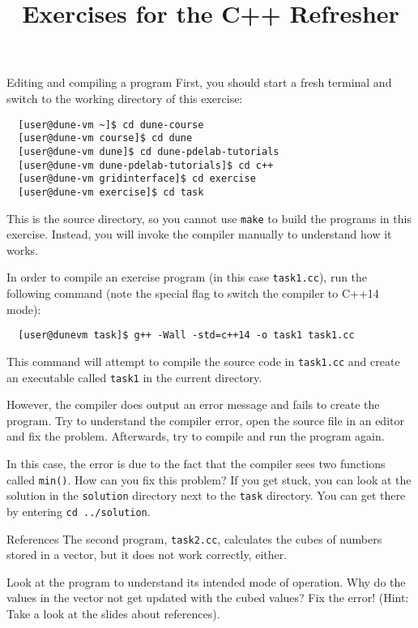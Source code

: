 \documentclass[12pt,a4paper]{article}
\title{\textbf{Exercises for the C++ Refresher}}
\begin{document}
\exerciseheader

\begin{Exercise}{Editing and compiling a program}
First, you should start a fresh terminal and switch to the working directory of this exercise:
\begin{lstlisting}
  [user@dune-vm ~]$ cd dune-course
  [user@dune-vm course]$ cd dune
  [user@dune-vm dune]$ cd dune-pdelab-tutorials
  [user@dune-vm dune-pdelab-tutorials]$ cd c++
  [user@dune-vm gridinterface]$ cd exercise
  [user@dune-vm exercise]$ cd task
\end{lstlisting}

This is the source directory, so you cannot use \lstinline!make! to build the programs in this exercise.
Instead, you will invoke the compiler manually to understand how it works.

In order to compile an exercise program (in this case \lstinline!task1.cc!), run the following command (note
the special flag to switch the compiler to C++14 mode):

\begin{lstlisting}
  [user@dunevm task]$ g++ -Wall -std=c++14 -o task1 task1.cc
\end{lstlisting}

This command will attempt to compile the source code in \lstinline!task1.cc! and create an executable called \lstinline!task1! in the current directory.

However, the compiler does output an error message and fails to create the program. Try to understand the compiler error, open the source file in an editor and fix the problem. Afterwards, try to compile and run the program again.

In this case, the error is due to the fact that the compiler sees two functions called \texttt{min()}. How
can you fix this problem? If you get stuck, you can look at the solution in the \lstinline!solution! directory next to the \lstinline!task! directory. You can get there by entering \lstinline!cd ../solution!.

\end{Exercise}

\begin{Exercise}{References}
The second program, \lstinline!task2.cc!, calculates the cubes of numbers stored in a vector, but it does not
work correctly, either.

Look at the program to understand its intended mode of operation. Why do the values in the vector not get
updated with the cubed values? Fix the error! (Hint: Take a look at the slides about references).

\end{Exercise}
\end{document}
